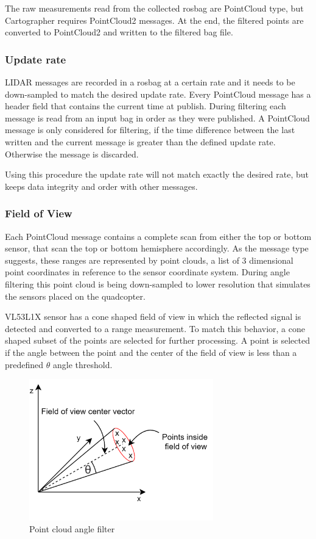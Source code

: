 The raw measurements read from the collected rosbag are PointCloud type, but Cartographer requires 
PointCloud2 messages. At the end, the filtered points are converted to PointCloud2 and written
to the filtered bag file. 

\subsubsection{Update rate}
LIDAR messages are recorded in a rosbag at a certain rate and it needs to be down-sampled to match
the desired update rate. Every PointCloud message has a header field that contains the current time
at publish. During filtering each message is read from an input bag in order as they were published.
A PointCloud message is only considered for filtering, if the time difference between the last written 
and the current message is greater than the defined update rate. Otherwise the message is discarded.

Using this procedure the update rate will not match exactly the desired rate, but keeps data integrity
and order with other messages. 



\subsubsection{Field of View}
Each PointCloud message contains a complete scan from either the top or bottom sensor, that scan the 
top or bottom hemisphere accordingly. As the message type suggests, these ranges are represented by 
point clouds, a list of 3 dimensional point coordinates in reference to the sensor coordinate system. During 
angle filtering this point cloud is being down-sampled to lower resolution that simulates the sensors
placed on the quadcopter.

VL53L1X sensor has a cone shaped field of view in which the reflected signal is detected and converted to
a range measurement. To match this behavior, a cone shaped subset of the points are selected for further
processing. A point is selected if the angle between the point and the center of the field of view is less
than a predefined $\theta$ angle threshold.

\begin{figure}[!ht]
    \centering
    \includegraphics[width=80mm, keepaspectratio]{figures/data_angle_filter.png}
    \caption{Point cloud angle filter}
    \label{fig:data_angle_filter}
\end{figure}



